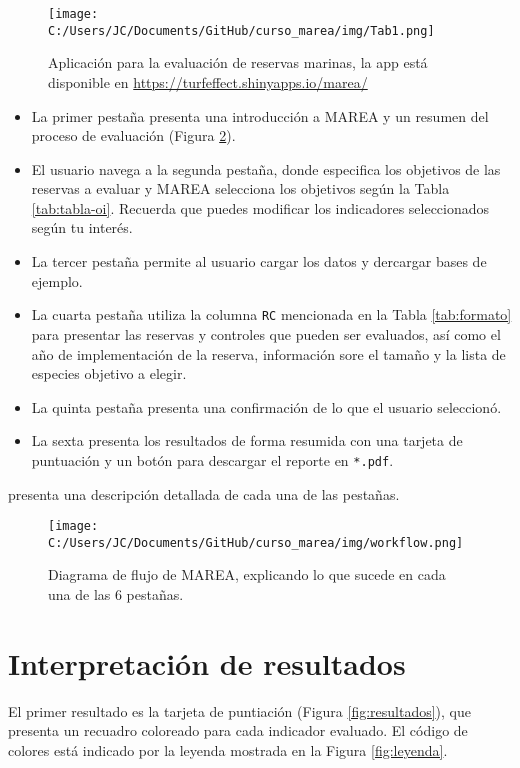\documentclass[]{krantz}
\providecommand{\tightlist}{%
  \setlength{\itemsep}{0pt}\setlength{\parskip}{0pt}}
\begin{document}
\begin{figure}
\centering
\texttt{[image: C:/Users/JC/Documents/GitHub/curso\_marea/img/Tab1.png]}
\caption{\label{fig:shiny-marea}Aplicación para la evaluación de reservas marinas, la app está disponible en \url{https://turfeffect.shinyapps.io/marea/}}
\end{figure}

\begin{itemize}
\tightlist
\item
  La primer pestaña presenta una introducción a MAREA y un resumen del proceso de evaluación (Figura \ref{fig:workflow}).
\item
  El usuario navega a la segunda pestaña, donde especifica los objetivos de las reservas a evaluar y MAREA selecciona los objetivos según la Tabla \ref{tab:tabla-oi}. Recuerda que puedes modificar los indicadores seleccionados según tu interés.
\item
  La tercer pestaña permite al usuario cargar los datos y dercargar bases de ejemplo.
\item
  La cuarta pestaña utiliza la columna \texttt{RC} mencionada en la Tabla \ref{tab:formato} para presentar las reservas y controles que pueden ser evaluados, así como el año de implementación de la reserva, información sore el tamaño y la lista de especies objetivo a elegir.
\item
  La quinta pestaña presenta una confirmación de lo que el usuario seleccionó.
\item
  La sexta presenta los resultados de forma resumida con una tarjeta de puntuación y un botón para descargar el reporte en \texttt{*.pdf}.
\end{itemize}

\citet{villaseorderbez_2017} presenta una descripción detallada de cada una de las pestañas.

\begin{figure}
\centering
\texttt{[image: C:/Users/JC/Documents/GitHub/curso\_marea/img/workflow.png]}
\caption{\label{fig:workflow}Diagrama de flujo de MAREA, explicando lo que sucede en cada una de las 6 pestañas.}
\end{figure}

\hypertarget{interpretacion-de-resultados}{%
\section{Interpretación de resultados}\label{interpretacion-de-resultados}}

El primer resultado es la tarjeta de puntiación (Figura \ref{fig:resultados}), que presenta un recuadro coloreado para cada indicador evaluado. El código de colores está indicado por la leyenda mostrada en la Figura \ref{fig:leyenda}.
\end{document}
